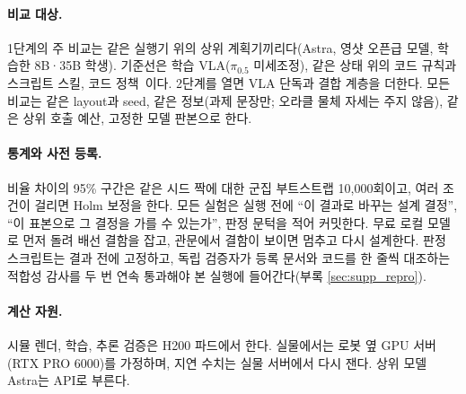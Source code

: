 \paragraph{비교 대상.}
1단계의 주 비교는 같은 실행기 위의 상위 계획기끼리다(Astra, 영샷 오픈급 모델, 학습한 8B·35B 학생). 기준선은 학습 VLA($\pi_{0.5}$ 미세조정), 같은 상태 위의 코드 규칙과 스크립트 스킬, 코드 정책~\cite{fu2026capx}이다. 2단계를 열면 VLA 단독과 결합 계층을 더한다. 모든 비교는 같은 layout과 seed, 같은 정보(과제 문장만; 오라클 물체 자세는 주지 않음), 같은 상위 호출 예산, 고정한 모델 판본으로 한다.

\paragraph{통계와 사전 등록.}
비율 차이의 95\% 구간은 같은 시드 짝에 대한 군집 부트스트랩 10,000회이고, 여러 조건이 걸리면 Holm 보정을 한다. 모든 실험은 실행 전에 ``이 결과로 바꾸는 설계 결정'', ``이 표본으로 그 결정을 가를 수 있는가'', 판정 문턱을 적어 커밋한다. 무료 로컬 모델로 먼저 돌려 배선 결함을 잡고, 관문에서 결함이 보이면 멈추고 다시 설계한다. 판정 스크립트는 결과 전에 고정하고, 독립 검증자가 등록 문서와 코드를 한 줄씩 대조하는 적합성 감사를 두 번 연속 통과해야 본 실행에 들어간다(부록 \cref{sec:supp_repro}).

\paragraph{계산 자원.}
시뮬 렌더, 학습, 추론 검증은 H200 파드에서 한다. 실물에서는 로봇 옆 GPU 서버(RTX PRO 6000)를 가정하며, 지연 수치는 실물 서버에서 다시 잰다. 상위 모델 Astra는 API로 부른다.
